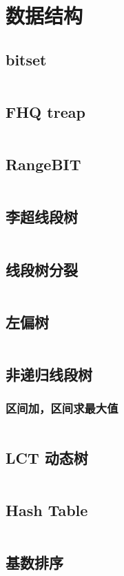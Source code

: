 \section{数据结构}
				\subsection{bitset}
					\inputminted{cpp}{src/DataStructure/bitset.cpp}
				\subsection{FHQ treap}
					\inputminted{cpp}{src/DataStructure/FHQ.cpp}
				\subsection{RangeBIT}
					\inputminted{cpp}{src/DataStructure/RangeBIT.cpp}
				\subsection{李超线段树}
					\inputminted{cpp}{src/DataStructure/李超线段树.cpp}
				\subsection{线段树分裂}
					\inputminted{cpp}{src/DataStructure/线段树分裂.cpp}
				\subsection{左偏树}
					\inputminted{cpp}{src/DataStructure/左偏树.cpp}
				\subsection{非递归线段树}
					\subsubsection{区间加，区间求最大值}
						\inputminted{cpp}{src/DataStructure/非递归线段树求最大值.cpp}
				\subsection{LCT 动态树}
					\inputminted{cpp}{src/DataStructure/LCT.cpp}

				\subsection{Hash Table}
					\inputminted[highlightlines={4,15,17,18}]{cpp}{src/DataStructure/hashmap.cpp}
				\subsection{基数排序}
					\inputminted{cpp}{src/Miscellany/RadixSort.cpp}
